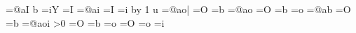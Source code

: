 {    \ifpreviousisboundary%
     \t@kenbuffer=\expandafter{\the\t@kenbuffer @aI}%
    \else%
     \if\previouschar b%
      \t@kenbuffer=\expandafter{\the\t@kenbuffer iY}%
     \else
      \t@kenbuffer=\expandafter{\the\t@kenbuffer I}%
     \fi
    \fi%
   \else%
    \ifpreviousisboundary%
     \t@kenbuffer=\expandafter{\the\t@kenbuffer @ai}%
    \else%
     \iffollowingispseudoboundary
      \t@kenbuffer=\expandafter{\the\t@kenbuffer I}%
     \else
      \t@kenbuffer=\expandafter{\the\t@kenbuffer i}%
     \fi
    \fi
   \fi
   \advance\syllablecount by 1
  \else \if\thischar u%
   \iffollowingisboundary%
    \ifpreviousisboundary%
     \t@kenbuffer=\expandafter{\the\t@kenbuffer @ao|}%
    \else%
     \ifpreviousisround
      \t@kenbuffer=\expandafter{\the\t@kenbuffer O}%
     \else
      \t@kenbuffer=\expandafter{\the\t@kenbuffer b}%
     \fi
    \fi%
   \else%
    \ifpreviousisboundary%
     \t@kenbuffer=\expandafter{\the\t@kenbuffer @ao}%
    \else%
     \ifpreviousisround
      \t@kenbuffer=\expandafter{\the\t@kenbuffer O}%
     \else
      \iffollowingispseudoboundary
       \t@kenbuffer=\expandafter{\the\t@kenbuffer b}%
      \else
       \t@kenbuffer=\expandafter{\the\t@kenbuffer o}%
      \fi
     \fi
    \fi
   \fi
  \else \if\thischar\u@mlaut%
   \iffollowingisboundary%
    \ifpreviousisboundary%
     \t@kenbuffer=\expandafter{\the\t@kenbuffer @ab}%
    \else%
     \ifpreviousisround
      \t@kenbuffer=\expandafter{\the\t@kenbuffer O}%
     \else
      \t@kenbuffer=\expandafter{\the\t@kenbuffer b}%
     \fi
    \fi%
   \else%
    \ifpreviousisboundary%
     \t@kenbuffer=\expandafter{\the\t@kenbuffer @aoi}%
    \else%
     \ifnum\syllablecount>0
      \ifpreviousisround
       \t@kenbuffer=\expandafter{\the\t@kenbuffer O}%
      \else
       \iffollowingispseudoboundary
        \t@kenbuffer=\expandafter{\the\t@kenbuffer b}%
       \else
        \t@kenbuffer=\expandafter{\the\t@kenbuffer o}%
       \fi
      \fi
     \else
      \ifpreviousisround
       \t@kenbuffer=\expandafter{\the\t@kenbuffer O}%
      \else
       \t@kenbuffer=\expandafter{\the\t@kenbuffer o}%
      \fi
      \ifcase\thisfvs
       \t@kenbuffer=\expandafter{\the\t@kenbuffer i}%
      \or
}

